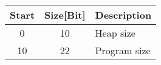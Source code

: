 	\begin{tabular}{c|c|l}
		\textbf{Start} & \textbf{Size[Bit]} & \textbf{Description} \\ \hline
		0 & 10 & Heap size \\ 
		10 & 22 & Program size \\
	\end{tabular}